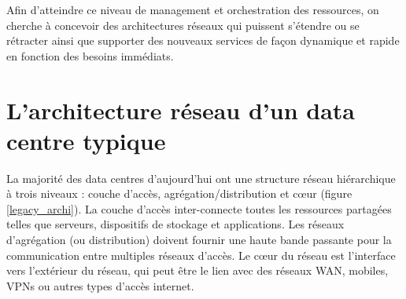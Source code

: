 Afin d'atteindre ce niveau de management et orchestration des ressources, on cherche  à concevoir des architectures réseaux qui puissent s'étendre ou se rétracter ainsi que supporter des nouveaux services de façon dynamique et rapide en fonction des besoins immédiats. \cite{ibmPlanningVirtCCchap4} \cite{cloudAutomation} \cite{hpCloudEffectsOnNetworkIntro}


\section{L'architecture réseau d'un data centre typique}

La majorité des data centres d'aujourd'hui ont une structure réseau hiérarchique à trois niveaux : couche d'accès, agrégation/distribution et cœur (figure \ref{legacy_archi}). La couche d'accès inter-connecte toutes les ressources partagées telles que serveurs, dispositifs de stockage et applications. Les réseaux d'agrégation (ou distribution) doivent fournir une haute bande passante pour la communication entre multiples réseaux d'accès. Le cœur du réseau est l'interface vers l'extérieur du réseau, qui peut être le lien avec des réseaux WAN, mobiles, VPNs ou autres types d'accès internet. \\



